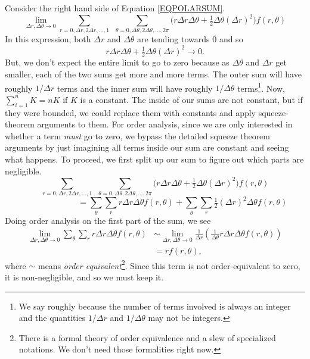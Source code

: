 Consider the right hand side of Equation \eqref{EQPOLARSUM}.
\[
	\lim_{\Delta r,\Delta \theta\to 0}
	\sum_{r=0,\Delta r,2\Delta r,\ldots,1}\ \ \sum_{\theta=0,\Delta\theta,
	2\Delta\theta, \ldots, 2\pi} \Big(
		r\Delta r\Delta \theta + \tfrac{1}{2}\Delta\theta(\Delta r)^2
	\Big)f(r,\theta)
\]
In this expression, both $\Delta r$
and $\Delta \theta$ are tending towards $0$ and so 
\[
	r\Delta r\Delta \theta + \tfrac{1}{2}\Delta\theta(\Delta r)^2\to 0.
\]
But, we don't expect the entire limit to go to zero because as $\Delta\theta$ and $\Delta r$
get smaller, each of the two sums get more and more terms.  The outer sum will have roughly
$1/\Delta r$ terms and the inner sum will have roughly $1/\Delta \theta$ terms\footnote{
We say roughly because the number of terms involved is always an integer and the quantities
$1/\Delta r$ and $1/\Delta \theta$ may not be integers.
}.  
Now, $\sum_{i=1}^n K=nK$ if $K$ is a constant.  The inside of our sums are not constant, but if
they were bounded, we could replace them with constants and apply squeeze-theorem arguments to them.
For order analysis, since we are only interested in whether a term
\emph{must} go to zero, we bypass the detailed squeeze theorem arguments 
by just imagining all terms inside our sum are constant and seeing what happens.
To proceed, we first split up
our sum to figure out which parts are negligible.
\[
			\sum_{r=0,\Delta r,2\Delta r,\ldots,1}\ \ \sum_{\theta=0,\Delta\theta,
	2\Delta\theta, \ldots, 2\pi} \Big(
		r\Delta r\Delta \theta + \tfrac{1}{2}\Delta\theta(\Delta r)^2
		\Big)f(r,\theta)
\]
\[
	\phantom{XXXXXXXX}=\sum_{\theta}\sum_{r} r\Delta r\Delta \theta f(r,\theta)
	+ 
		\sum_{\theta}\sum_{r} \tfrac{1}{2}(\Delta r)^2\Delta \theta f(r,\theta)
\]
Doing order analysis on the first part of the sum, we see
\begin{align*}
	\lim_{\Delta r,\Delta\theta\to 0}
	\sum_{\theta}\sum_{r} r\Delta r\Delta \theta f(r,\theta)
	&\sim
	\lim_{\Delta r,\Delta\theta\to 0}
	\frac{1}{\Delta r}\left(\frac{1}{\Delta \theta} r\Delta r\Delta\theta f(r,\theta)\right)\\
	&=rf(r,\theta),
\end{align*}
where $\sim$ means \emph{order equivalent}\footnote{ There is a formal theory of
order equivalence and a slew of specialized notations.  We don't need those formalities
right now.}.  Since this term is not order-equivalent to zero, it is non-negligible, and so 
we must keep it.  

